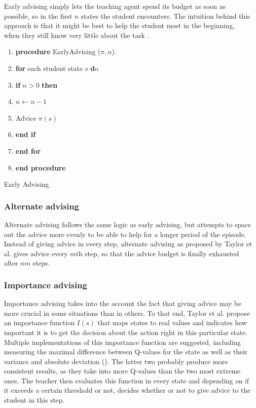 \documentclass[12pt,twoside]{article}
\theoremstyle{plain}
\theoremstyle{definition}
\theoremstyle{remark}
\begin{document}
Early advising simply lets the teaching agent spend its budget as soon as possible, so in the first $n$ states the student encounters. The intuition behind this approach is that it might be best to help the student most in the beginning, when they still know very little about the task \cite{Taylor2014reinforcement}.


\begin{algorithm}[H]
  \scriptsize
  \begin{enumerate}
	\linespread{1.0}
	\item \textbf{procedure} EarlyAdvising ($\pi, n$). 
	\item \qquad \textbf{for} each student state $s$ \textbf do
	\item \qquad \qquad \textbf{if} $n > 0$ \textbf{then}
	\item \qquad \qquad \qquad $n \leftarrow n - 1$
	\item \qquad \qquad \qquad Advice $\pi(s)$
	\item \qquad \qquad \textbf{end if}
	\item \qquad \textbf{end for}
	\item \textbf{end procedure}
	\end{enumerate}
  	\caption{Early Advising}
\end{algorithm}


\subsubsection{Alternate advising}

Alternate advising follows the same logic as early advising, but attempts to space out the advice more evenly to be able to help for a longer period of the episode. Instead of giving advice in every step, alternate advising as proposed by Taylor et al. gives advice every $m$th step, so that the advice budget is finally exhausted after $nm$ steps.


\subsubsection{Importance advising}

Importance advising takes into the account the fact that giving advice may be more crucial in some situations than in others. To that end, Taylor et al. propose an importance function $I(s)$ that maps states to real values and indicates how important it is to get the decision about the action right in this particular state. Multiple implementations of this importance function are suggested, including measuring the maximal difference between Q-values for the state as well as their variance and absolute deviation (\cite{Taylor2014reinforcement}). The latter two probably produce more consistent results, as they take into more Q-values than the two most extreme ones.
The teacher then evaluates this function in every state and depending on if it exceeds a certain threshold or not, decides whether or not to give advice to the student in this step.
\end{document}
